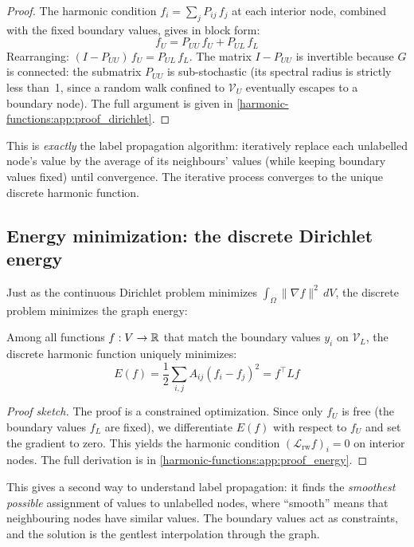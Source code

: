 \begin{notechapter}
\begin{proof}
The harmonic condition $f_i = \sum_j P_{ij}\,f_j$ at each interior node,
combined with the fixed boundary values, gives in block form:
\[
f_U = P_{UU}\,f_U + P_{UL}\,f_L
\]
Rearranging: $(I - P_{UU})\,f_U = P_{UL}\,f_L$. The matrix $I - P_{UU}$ is
invertible because $G$ is connected: the submatrix $P_{UU}$ is
sub-stochastic (its spectral radius is strictly less than~1, since a random
walk confined to $\mathcal{V}_U$ eventually escapes to a boundary node). The
full argument is given in \cref{harmonic-functions:app:proof_dirichlet}.
\end{proof}

This is \emph{exactly} the label propagation algorithm: iteratively replace
each unlabelled node's value by the average of its neighbours' values (while
keeping boundary values fixed) until convergence. The iterative process
converges to the unique discrete harmonic function.

\subsection{Energy minimization: the discrete Dirichlet energy}

Just as the continuous Dirichlet problem minimizes
$\int_\Omega \|\nabla f\|^2\,dV$, the discrete problem minimizes the graph
energy:

\begin{proposition}
\label{harmonic-functions:prop:energy_min}
Among all functions $f : V \to \mathbb{R}$ that match the boundary values $y_i$
on $\mathcal{V}_L$, the discrete harmonic function uniquely minimizes:
\begin{equation}
E(f) = \frac{1}{2}\sum_{i,j} A_{ij}(f_i - f_j)^2 = f^\top L f
\end{equation}
\end{proposition}

\begin{proof}[Proof sketch]
The proof is a constrained optimization. Since only $f_U$ is free (the
boundary values $f_L$ are fixed), we differentiate $E(f)$ with respect to
$f_U$ and set the gradient to zero. This yields the harmonic condition
$(\mathcal{L}_{\mathrm{rw}} f)_i = 0$ on interior nodes. The full
derivation is in \cref{harmonic-functions:app:proof_energy}.
\end{proof}

This gives a second way to understand label propagation: it finds the
\emph{smoothest possible} assignment of values to unlabelled nodes, where
``smooth'' means that neighbouring nodes have similar values. The boundary
values act as constraints, and the solution is the gentlest interpolation
through the graph.


\end{notechapter}
